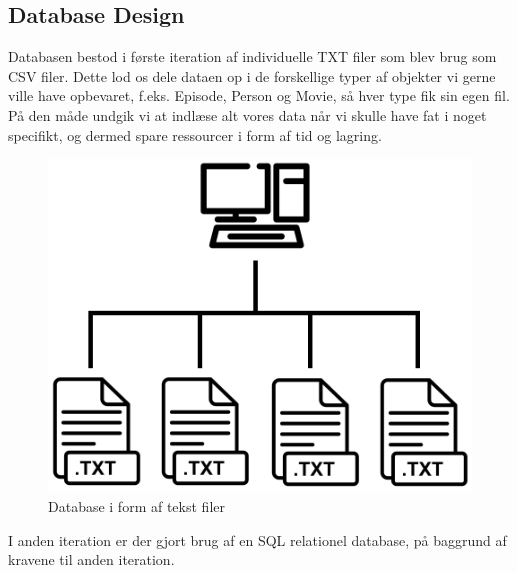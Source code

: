 \subsection{Database Design}
Databasen bestod i første iteration af individuelle TXT filer som blev brug som CSV filer. Dette lod os dele dataen op i de forskellige typer af objekter vi gerne ville have opbevaret, f.eks. Episode, Person og Movie, så hver type fik sin egen fil. På den måde undgik vi at indlæse alt vores data når vi skulle have fat i noget specifikt, og dermed spare ressourcer i form af tid og lagring.

\begin{figure}[H]
    \centering
\includegraphics[scale = 0.35]{images/computer_to_txt_file_icon.png}
\caption{Database i form af tekst filer}
\end{figure}

I anden iteration er der gjort brug af en SQL relationel database, på baggrund af kravene til anden iteration. 